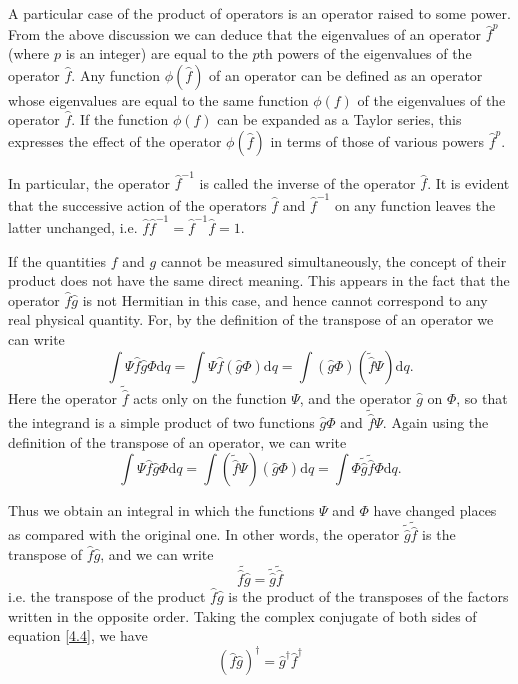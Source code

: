 A particular case of the product of operators is an operator raised to some power. From the above discussion we can deduce that the eigenvalues of an operator $ \hat{f}^p $ (where $ p $ is an integer) are equal to the $ p $th powers of the eigenvalues of the operator $ \hat{f} $. Any function $ \phi(\hat{f}) $ of an operator can be defined as an operator whose eigenvalues are equal to the same function $ \phi(f) $ of the eigenvalues of the operator $ \hat{f} $. If the function $ \phi(f) $ can be expanded as a Taylor series, this expresses the effect of the operator $ \phi(\hat{f}) $ in terms of those of various powers $ \hat{f}^p $.

In particular, the operator $ \hat{f}^{-1} $ is called the inverse of the operator $ \hat{f} $. It is evident that the successive action of the operators $ \hat{f} $ and $ \hat{f}^{-1} $ on any function leaves the latter unchanged, i.e. $\hat{f}\hat{f}^{-1}=\hat{f}^{-1}\hat{f}=1  $.

If the quantities $ f $ and $ g $ cannot be measured simultaneously, the concept of their product does not have the same direct meaning. This appears in the fact that the operator $ \hat{f}\hat{g} $ is not Hermitian in this case, and hence cannot correspond to any real physical quantity. For, by the definition of the transpose of an operator we can write
\[ \int\Psi\hat{f}\hat{g}\Phi\mathrm{d}q=\int\Psi\hat{f}(\hat{g}\Phi)\mathrm{d}q=\int(\hat{g}\Phi)(\tilde{\hat{f}}\Psi)\mathrm{d}q. \]
Here the operator $ \tilde{\hat{f}} $ acts only on the function $ \Psi $, and the operator $ \hat{g} $ on $ \Phi $, so that the integrand is a simple product of two functions $ \hat{g}\Phi $ and $ \tilde{\hat{f}}\Psi $. Again using the definition of the transpose of an operator, we can write
\[ \int\Psi\hat{f}\hat{g}\Phi\mathrm{d}q=\int(\tilde{\hat{f}}\Psi)(\hat{g}\Phi)\mathrm{d}q=\int\Phi\tilde{\hat{g}}\tilde{\hat{f}}\Phi\mathrm{d}q. \]

Thus we obtain an integral in which the functions $ \Psi $ and $ \Phi $ have changed places as compared with the original one. In other words, the operator $ \tilde{\hat{g}}\tilde{\hat{f}} $ is the transpose of $ \hat{f}\hat{g} $, and we can write
\begin{equation}\label{4.4}
\widetilde{\hat{f}\hat{g}}=\tilde{\hat{g}}\tilde{\hat{f}}
\end{equation}
i.e. the transpose of the product $ \hat{f}\hat{g} $ is the product of the transposes of the factors written in the opposite order. Taking the complex conjugate of both sides of equation \eqref{4.4}, we have
\begin{equation}\label{4.5}
(\hat{f}\hat{g})^\dag=\hat{g}^\dag\hat{f}^\dag
\end{equation}

